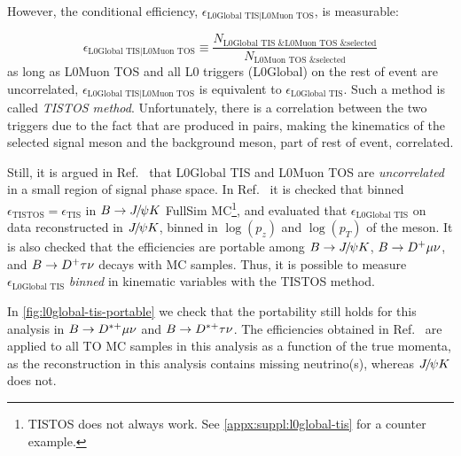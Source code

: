 However, the conditional efficiency, $\epsilon_\text{L0Global TIS|L0Muon TOS}$,
is measurable:

\begin{equation}
    \epsilon_\text{L0Global TIS|L0Muon TOS} \equiv
    \frac{N_\text{L0Global TIS \& L0Muon TOS \& selected}}{
          N_\text{L0Muon TOS \& selected}}
\end{equation}
as long as L0Muon TOS and all L0 triggers (L0Global) on the rest of event are
uncorrelated,
$\epsilon_\text{L0Global TIS|L0Muon TOS}$ is equivalent to
$\epsilon_\text{L0Global TIS}$.
Such a method is called \emph{TISTOS method}.
Unfortunately, there is a correlation between the two triggers due to
the fact that \bbbar are produced in pairs,
making the kinematics of the selected signal \B meson and the background \Bbar
meson,
part of rest of event, correlated.

Still, it is argued in Ref.~\cite{LHCb-PUB-2014-039}
that L0Global TIS and L0Muon TOS are \emph{uncorrelated} in a small region of
signal \B phase space.
In Ref.~\cite{LHCb-INT-2019-025} it is checked that binned
$\epsilon_\text{TISTOS} = \epsilon_\text{TIS}$ in
${B} \rightarrow {\ensuremath{{J\mskip -3mu/\mskip -2mu\psi}}} K$ FullSim MC\footnote{
    TISTOS does not always work. See \cref{appx:suppl:l0global-tis} for a
    counter example.
},
and evaluated that
$\epsilon_\text{L0Global TIS}$ on data reconstructed in ${{J\mskip -3mu/\mskip -2mu\psi}} K$,
binned in $\log(p_z)$ and $\log(p_T)$ of the \B meson.
It is also checked that the efficiencies are portable among
${B} \rightarrow {\ensuremath{{J\mskip -3mu/\mskip -2mu\psi}}} K$, ${B} \rightarrow {\ensuremath{{D}^+}} {\ensuremath{\mu}} {\ensuremath{\nu}}$, and
${B} \rightarrow {\ensuremath{{D}^+}} {\ensuremath{\tau}} {\ensuremath{\nu}}$ decays with MC samples.
Thus, it is possible to measure $\epsilon_\text{L0Global TIS}$ \emph{binned} in
\B kinematic variables with the TISTOS method.

In \cref{fig:l0global-tis-portable} we check
that the portability still holds for this analysis in
${B} \rightarrow {\ensuremath{{D}^{*+}}} {\ensuremath{\mu}} {\ensuremath{\nu}}$ and ${B} \rightarrow {\ensuremath{{D}^{*+}}} {\ensuremath{\tau}} {\ensuremath{\nu}}$.
The efficiencies obtained in Ref.~\cite{LHCb-INT-2019-025} are applied to all TO
MC samples in this analysis as a function of the true momenta,
as the reconstruction in this analysis contains missing neutrino(s),
whereas ${{J\mskip -3mu/\mskip -2mu\psi}} K$ does not.

